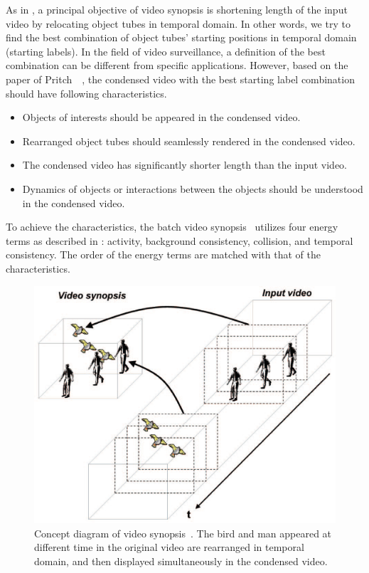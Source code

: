\documentclass[11pt]{hyu_thesis}
\begin{document}
As in , a principal objective of video synopsis is shortening length of the input video by relocating object tubes in temporal domain. In other words, we try to find the best combination of object tubes' starting positions in temporal domain (starting labels). In the field of video surveillance, a definition of the best combination can be different from specific applications. However, based on the paper of Pritch~\etal~\cite{Pritch2008}, the condensed video with the best starting label combination should have following characteristics.
\begin{itemize}
\item Objects of interests should be appeared in the condensed video.
\item Rearranged object tubes should seamlessly rendered in the condensed video.
\item The condensed video has significantly shorter length than the input video.
\item Dynamics of objects or interactions between the objects should be understood in the condensed video.
\end{itemize}
To achieve the characteristics, the batch video synopsis~\cite{Pritch2008} utilizes four energy terms as described in : activity, background consistency, collision, and temporal consistency. The order of the energy terms are matched with that of the characteristics.

\begin{figure}
	\begin{center}
		\includegraphics[width=\linewidth]{video_synopsis.eps}
	\end{center}
	\caption{Concept diagram of video synopsis~\cite{Pritch2008}. The bird and man appeared at different time in the original video are rearranged in temporal domain, and then displayed simultaneously in the condensed video.}
	\label{fig:video_synopsis}
\end{figure}
\end{document}
